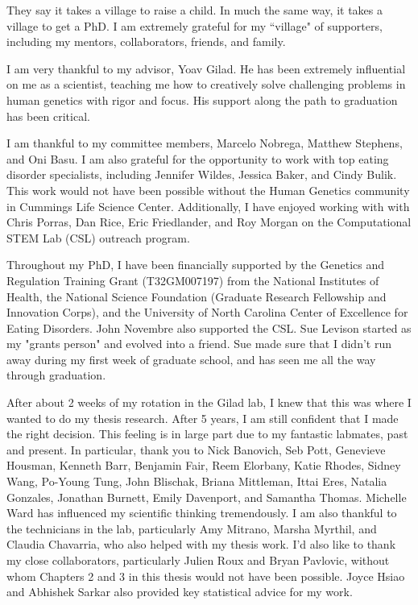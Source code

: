 \acknowledgments

They say it takes a village to raise a child. In much the same way, it takes a village to get a PhD. I am extremely grateful for my ``village" of supporters, including my mentors, collaborators, friends, and family.

I am very thankful to my advisor, Yoav Gilad. He has been extremely influential on me as a scientist, teaching me how to creatively solve challenging problems in human genetics with rigor and focus. His support along the path to graduation has been critical. 

I am thankful to my committee members, Marcelo Nobrega, Matthew Stephens, and Oni Basu. I am also grateful for the opportunity to work with top eating disorder specialists, including Jennifer Wildes, Jessica Baker, and Cindy Bulik. This work would not have been possible without the Human Genetics
community in Cummings Life Science Center. Additionally, I have enjoyed working with with Chris Porras, Dan Rice, Eric Friedlander, and Roy Morgan on the Computational STEM Lab (CSL) outreach program. 

Throughout my PhD, I have been financially supported by the Genetics and Regulation Training Grant (T32GM007197) from the National Institutes
of Health, the National Science Foundation (Graduate Research Fellowship and Innovation Corps), and the University of North Carolina Center of Excellence for Eating Disorders. John Novembre also supported the CSL. Sue Levison started as my "grants person" and evolved into a friend. Sue made sure that I didn't run away during my first week of graduate school, and has seen me all the way through graduation.   

After about 2 weeks of my rotation in the Gilad lab, I knew that this was where I wanted to do my thesis research. After 5 years, I am still confident that I made the right decision. This feeling is in large part due to my fantastic labmates, past and present. In particular, thank you to Nick Banovich, Seb Pott, Genevieve Housman, Kenneth Barr, Benjamin Fair, Reem Elorbany, Katie Rhodes, Sidney Wang, Po-Young Tung, John Blischak, Briana Mittleman, Ittai Eres, Natalia Gonzales, Jonathan Burnett, Emily Davenport, and Samantha Thomas. Michelle Ward has influenced my scientific thinking tremendously. I am also thankful to the technicians in the lab, particularly Amy Mitrano,
Marsha Myrthil, and Claudia Chavarria, who also helped with my thesis work. I'd also like to thank my close collaborators, particularly Julien Roux and Bryan Pavlovic, without whom Chapters 2 and 3 in this thesis would not have been possible. Joyce Hsiao and Abhishek Sarkar also provided key statistical advice for my work. 

